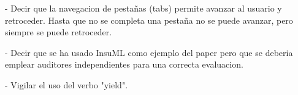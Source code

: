 - Decir que la navegacion de pestañas (tabs) permite avanzar al usuario y retroceder. Hasta que no se completa una pestaña no se puede avanzar, pero siempre se puede retroceder.

- Decir que se ha usado InsuML como ejemplo del paper pero que se deberia emplear auditores independientes para una correcta evaluacion.

- Vigilar el uso del verbo "yield".